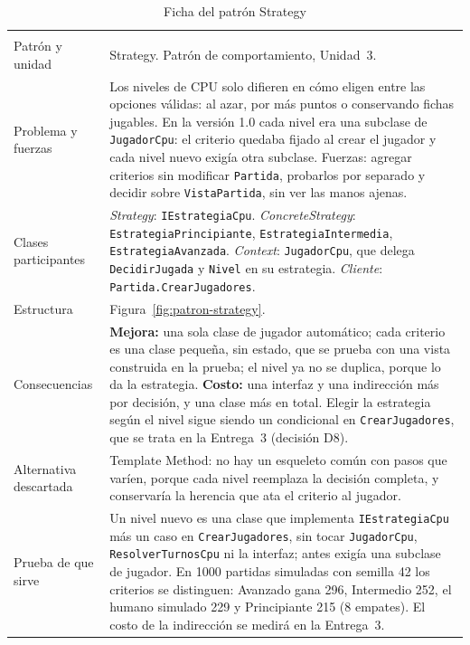 {\small{}\renewcommand{\arraystretch}{1.2}
\begin{longtable}{@{}L{3.1cm}L{11.4cm}@{}}
  \caption{Ficha del patrón Strategy}\label{tab:ficha-strategy}\\
  \toprule
   &  \\ \midrule \endfirsthead
  \toprule
   &  \\ \midrule \endhead
  \bottomrule \endlastfoot
  Patrón y unidad & Strategy. Patrón de comportamiento, Unidad~3. \\ \filasep
  Problema y fuerzas & Los niveles de CPU solo difieren en cómo eligen entre las opciones válidas: al azar, por más puntos o conservando fichas jugables. En la versión 1.0 cada nivel era una subclase de \texttt{JugadorCpu}: el criterio quedaba fijado al crear el jugador y cada nivel nuevo exigía otra subclase. Fuerzas: agregar criterios sin modificar \texttt{Partida}, probarlos por separado y decidir sobre \texttt{VistaPartida}, sin ver las manos ajenas. \\ \filasep
  Clases participantes & \emph{Strategy}: \texttt{IEstrategiaCpu}. \emph{ConcreteStrategy}: \texttt{EstrategiaPrincipiante}, \texttt{EstrategiaIntermedia}, \texttt{EstrategiaAvanzada}. \emph{Context}: \texttt{JugadorCpu}, que delega \texttt{DecidirJugada} y \texttt{Nivel} en su estrategia. \emph{Cliente}: \texttt{Partida.CrearJugadores}. \\ \filasep
  Estructura & Figura~\ref{fig:patron-strategy}. \\ \filasep
  Consecuencias & \textbf{Mejora:} una sola clase de jugador automático; cada criterio es una clase pequeña, sin estado, que se prueba con una vista construida en la prueba; el nivel ya no se duplica, porque lo da la estrategia. \textbf{Costo:} una interfaz y una indirección más por decisión, y una clase más en total. Elegir la estrategia según el nivel sigue siendo un condicional en \texttt{CrearJugadores}, que se trata en la Entrega~3 (decisión D8). \\ \filasep
  Alternativa descartada & Template Method: no hay un esqueleto común con pasos que varíen, porque cada nivel reemplaza la decisión completa, y conservaría la herencia que ata el criterio al jugador. \\ \filasep
  Prueba de que sirve & Un nivel nuevo es una clase que implementa \texttt{IEstrategiaCpu} más un caso en \texttt{CrearJugadores}, sin tocar \texttt{JugadorCpu}, \texttt{ResolverTurnosCpu} ni la interfaz; antes exigía una subclase de jugador. En 1000 partidas simuladas con semilla 42 los criterios se distinguen: Avanzado gana 296, Intermedio 252, el humano simulado 229 y Principiante 215 (8 empates). El costo de la indirección se medirá en la Entrega~3. \\
\end{longtable}}

